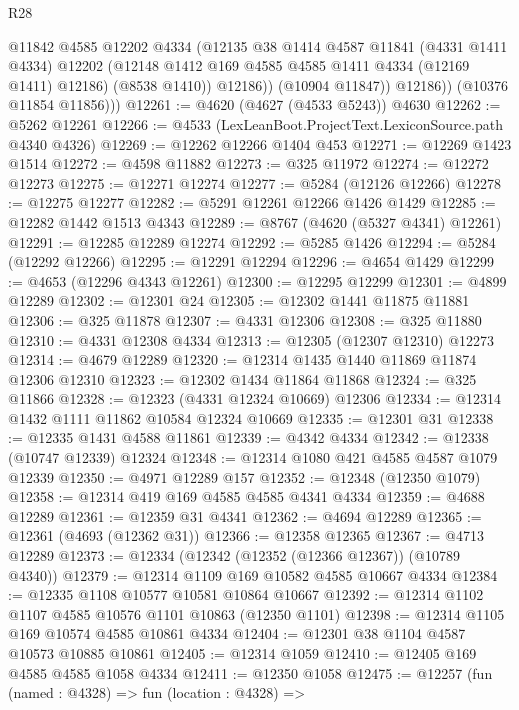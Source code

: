 \begin{lexlean}{R28}
\begin{coremodule}
                  @11842
                  @4585
                  @12202
                  @4334
                  (@12135
                    @38
                    @1414
                    @4587
                    @11841
                    (@4331 @1411 @4334)
                    @12202
                    (@12148 @1412 @169 @4585 @4585 @1411 @4334 (@12169 @1411) @12186)
                    (@8538 @1410))
                  @12186))
              (@10904 @11847))
            @12186))
        (@10376 @11854 @11856)))
@12261 := @4620 (@4627 (@4533 @5243)) @4630
@12262 := @5262 @12261
@12266 := @4533 (LexLeanBoot.ProjectText.LexiconSource.path @4340 @4326)
@12269 := @12262 @12266 @1404 @453
@12271 := @12269 @1423 @1514
@12272 := @4598 @11882
@12273 := @325 @11972
@12274 := @12272 @12273
@12275 := @12271 @12274
@12277 := @5284 (@12126 @12266)
@12278 := @12275 @12277
@12282 := @5291 @12261 @12266 @1426 @1429
@12285 := @12282 @1442 @1513 @4343
@12289 := @8767 (@4620 (@5327 @4341) @12261)
@12291 := @12285 @12289 @12274
@12292 := @5285 @1426
@12294 := @5284 (@12292 @12266)
@12295 := @12291 @12294
@12296 := @4654 @1429
@12299 := @4653 (@12296 @4343 @12261)
@12300 := @12295 @12299
@12301 := @4899 @12289
@12302 := @12301 @24
@12305 := @12302 @1441 @11875 @11881
@12306 := @325 @11878
@12307 := @4331 @12306
@12308 := @325 @11880
@12310 := @4331 @12308 @4334
@12313 := @12305 (@12307 @12310) @12273
@12314 := @4679 @12289
@12320 := @12314 @1435 @1440 @11869 @11874 @12306 @12310
@12323 := @12302 @1434 @11864 @11868
@12324 := @325 @11866
@12328 := @12323 (@4331 @12324 @10669) @12306
@12334 := @12314 @1432 @1111 @11862 @10584 @12324 @10669
@12335 := @12301 @31
@12338 := @12335 @1431 @4588 @11861
@12339 := @4342 @4334
@12342 := @12338 (@10747 @12339) @12324
@12348 := @12314 @1080 @421 @4585 @4587 @1079 @12339
@12350 := @4971 @12289 @157
@12352 := @12348 (@12350 @1079)
@12358 := @12314 @419 @169 @4585 @4585 @4341 @4334
@12359 := @4688 @12289
@12361 := @12359 @31 @4341
@12362 := @4694 @12289
@12365 := @12361 (@4693 (@12362 @31))
@12366 := @12358 @12365
@12367 := @4713 @12289
@12373 := @12334 (@12342 (@12352 (@12366 @12367)) (@10789 @4340))
@12379 := @12314 @1109 @169 @10582 @4585 @10667 @4334
@12384 := @12335 @1108 @10577 @10581 @10864 @10667
@12392 := @12314 @1102 @1107 @4585 @10576 @1101 @10863 (@12350 @1101)
@12398 := @12314 @1105 @169 @10574 @4585 @10861 @4334
@12404 := @12301 @38 @1104 @4587 @10573 @10885 @10861
@12405 := @12314 @1059
@12410 := @12405 @169 @4585 @4585 @1058 @4334
@12411 := @12350 @1058
@12475 := @12257
    (fun (named : @4328) =>
    fun (location : @4328) =>

\end{coremodule}
\end{lexlean}
